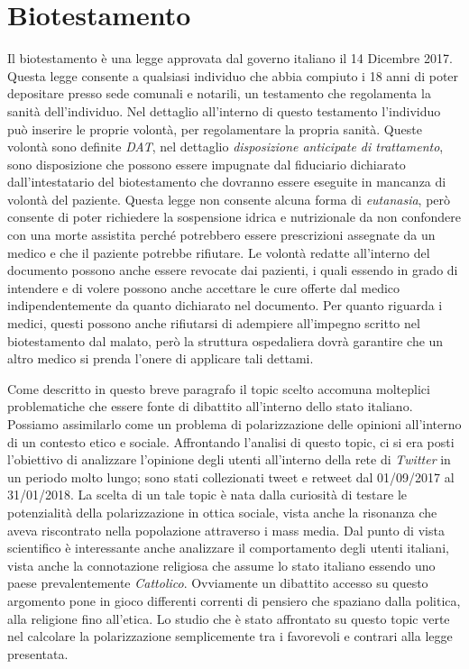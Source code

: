 \section{Biotestamento}
Il biotestamento è una legge approvata dal governo italiano il 14 Dicembre 2017. Questa legge consente a qualsiasi individuo che abbia compiuto i 18 anni di poter depositare presso sede comunali e notarili, un testamento che regolamenta la sanità dell'individuo. Nel dettaglio all'interno di questo testamento l'individuo può inserire le proprie volontà, per regolamentare la propria sanità. Queste volontà sono definite \textit{DAT}, nel dettaglio 		\textit{disposizione anticipate di trattamento}, sono disposizione che possono essere impugnate dal fiduciario dichiarato dall'intestatario del biotestamento che dovranno essere eseguite in mancanza di volontà del paziente.
Questa legge non consente alcuna forma di \textit{eutanasia}, però consente di poter richiedere la sospensione idrica e nutrizionale da non confondere con una morte assistita perché potrebbero essere prescrizioni  assegnate da un medico e che il paziente potrebbe rifiutare. Le volontà redatte all'interno del documento possono anche essere revocate dai pazienti, i quali essendo in grado di intendere e di volere possono anche accettare le cure offerte dal medico indipendentemente da quanto dichiarato nel documento. Per quanto riguarda i medici, questi possono anche rifiutarsi di adempiere all'impegno scritto nel biotestamento dal malato, però la struttura ospedaliera dovrà garantire che un altro medico si prenda l'onere di applicare tali dettami.

Come descritto in questo breve paragrafo il topic scelto accomuna molteplici problematiche che essere fonte di dibattito all'interno dello stato italiano. Possiamo assimilarlo come un problema di polarizzazione delle opinioni all'interno di un contesto etico e sociale.
Affrontando l'analisi di questo topic, ci si era posti l'obiettivo di analizzare l'opinione degli utenti all'interno della rete di \textit{Twitter} in un periodo molto lungo; sono stati collezionati tweet e retweet dal 01/09/2017 al 31/01/2018.
La scelta di un tale topic è nata dalla curiosità di testare le potenzialità della polarizzazione in ottica sociale, vista anche la risonanza che aveva riscontrato nella popolazione attraverso i mass media. Dal punto di vista scientifico è interessante anche analizzare il comportamento degli utenti italiani, vista anche la connotazione religiosa che assume lo stato italiano essendo uno paese prevalentemente \textit{Cattolico}. Ovviamente un dibattito accesso su questo argomento pone in gioco differenti correnti di pensiero che spaziano dalla politica, alla religione fino all'etica. 
Lo studio che è stato affrontato su questo topic verte nel calcolare la polarizzazione semplicemente tra i favorevoli e contrari alla legge presentata.

